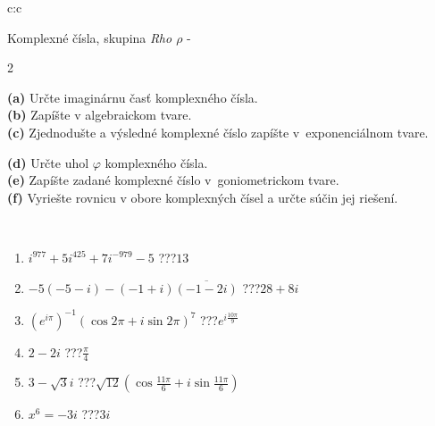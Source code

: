 \documentclass[10pt]{report}
\begin{document}
\begin{tabular}{c:c}
\begin{minipage}[c][104.5mm][t]{0.5\linewidth}
\begin{center}
\vspace{7mm}
{\huge Komplexné čísla, skupina \textit{Rho $\rho$} -}\\[5mm]
\begin{minipage}{0.95\linewidth}
\begin{center}
{\small \begin{multicols}{2} \raggedright
\textbf{(a)} Určte imaginárnu časť komplexného čísla. \\[1mm]
\textbf{(b)} Zapíšte v algebraickom tvare. \\[1mm]
\textbf{(c)} Zjednodušte a výsledné komplexné číslo zapíšte v~exponenciálnom tvare. \par \columnbreak
\textbf{(d)} Určte uhol \(\varphi\) komplexného čísla. \\[1mm]
\textbf{(e)} Zapíšte zadané komplexné číslo v~goniometrickom tvare. \\[1mm]
\textbf{(f)} Vyriešte rovnicu v obore komplexných čísel a určte súčin jej riešení.
\end{multicols}
}
\end{center}
\end{minipage}
\\[4mm]
\begin{minipage}{0.79\linewidth}
\begin{center}
\begin{varwidth}{\linewidth}
\begin{enumerate}
\large
\item $i^{977}+5i^{425}+7i^{-979}-5$\quad \dotfill\; ???\;\dotfill \quad $13$
\item $-5(-5-i)-(-1+i)\overline{(-1-2i)}$\quad \dotfill\; ???\;\dotfill \quad $28+8i$
\item $\left(e^{i\pi}\right)^{-1}\left(\cos{2\pi}+i\sin{2\pi}\right)^{7}$\quad \dotfill\; ???\;\dotfill \quad $e^{i\frac{10\pi}{9}}$
\item $2-2i$\quad \dotfill\; ???\;\dotfill \quad $\frac{\pi}{4}$
\item $3-\sqrt{3}i$\quad \dotfill\; ???\;\dotfill \quad $\sqrt{12}\left(\cos{\frac{11\pi}{6}}+i\sin{\frac{11\pi}{6}}\right)$
\item $x^6=-3i$\quad \dotfill\; ???\;\dotfill \quad $3i$
\end{enumerate}
\end{varwidth}
\end{center}

\end{minipage}
\end{center}
\end{minipage}
\end{tabular}
\end{document}
